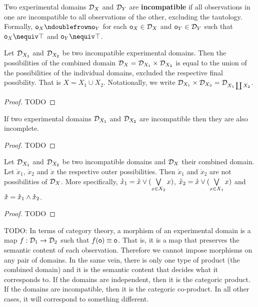 \documentclass[11pt,letterpaper,fleqn]{memoir} %
\begin{document}
\begin{mathSection}
	\begin{defn}
		Two experimental domains $\mathcal{D}_X$ and $\mathcal{D}_Y$ are \textbf{incompatible} if all observations in one are incompatible to all observations of the other, excluding the tautology. Formally, $\obs_X \ncomp \obs_Y$ for each $\mathsf{o}_X \in \mathcal{D}_X$ and $\mathsf{o}_Y \in \mathcal{D}_Y$ such that $\obs_X \nequiv \tautology $ and $\obs_Y \nequiv \tautology$.
	\end{defn}
	\begin{prop}
		Let $\mathcal{D}_{X_1}$ and $\mathcal{D}_{X_2}$ be two incompatible experimental domains. Then the possibilities of the combined domain $\mathcal{D}_X = \mathcal{D}_{X_1} \times \mathcal{D}_{X_2}$ is equal to the union of the possibilities of the individual domains, excluded the respective final possibility. That is $X = X_1 \cup X_2$. Notationally, we write $\mathcal{D}_{X_1} \times \mathcal{D}_{X_2} = \mathcal{D}_{X_1 \coprod X_2}$.
	\end{prop}
	\begin{proof}
		TODO
	\end{proof}
	\begin{prop}
		If two experimental domains $\mathcal{D}_{X_1}$ and $\mathcal{D}_{X_2}$ are incompatible then they are also incomplete.
	\end{prop}
	\begin{proof}
		TODO
	\end{proof}
	\begin{prop}
		Let $\mathcal{D}_{X_1}$ and $\mathcal{D}_{X_2}$ be two incompatible domains and $\mathcal{D}_{X}$ their combined domain. Let $\mathring{x}_1$, $\mathring{x}_2$ and $\mathring{x}$ the respective outer possibilities. Then $\mathring{x}_1$ and $\mathring{x}_2$ are not possibilities of $\mathcal{D}_{X}$. More specifically, $\mathring{x}_1 = \mathring{x} \vee ( \bigvee\limits_{x \in X_2} x )$, $\mathring{x}_2 = \mathring{x} \vee ( \bigvee\limits_{x \in X_1} x )$ and $\mathring{x} = \mathring{x}_1 \wedge \mathring{x}_2$.
	\end{prop}
	\begin{proof}
		TODO
	\end{proof}
\end{mathSection}

TODO: In terms of category theory, a morphism of an experimental domain is a map $f : \mathcal{D}_1 \to \mathcal{D}_2$ such that $f(\mathsf{o}) \equiv \mathsf{o}$. That is, it is a map that preserves the semantic content of each observation. Therefore we cannot impose morphisms on any pair of domains. In the same vein, there is only one type of product (the combined domain) and it is the semantic content that decides what it corresponds to. If the domains are independent, then it is the categoric product. If the domains are incompatible, then it is the categoric co-product. In all other cases, it will correspond to something different.
\end{document}
